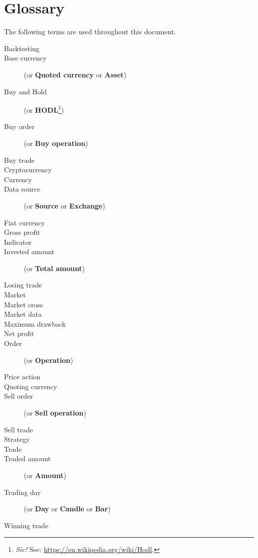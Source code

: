 \chapter{Glossary}\label{appendix:glossary}

The following terms are used throughout this document.

\begin{description}
	\item[Backtesting]
	\item[Base currency] (or \textbf{Quoted currency} or \textbf{Asset})
	\item[Buy and Hold] (or \textbf{HODL}\footnote{\textit{Sic!} See:
		\url{https://en.wikipedia.org/wiki/Hodl}.})
	\item[Buy order] (or \textbf{Buy operation})
	\item[Buy trade]
	\item[Cryptocurrency]
	\item[Currency]
	\item[Data source] (or \textbf{Source} or \textbf{Exchange})
	\item[Fiat currency]
	\item[Gross profit]
	\item[Indicator]
	\item[Invested amount] (or \textbf{Total amount})
	\item[Losing trade]
	\item[Market]
	\item[Market cross]
	\item[Market data]
	\item[Maximum drawback]
	\item[Net profit]
	\item[Order] (or \textbf{Operation})
	\item[Price action]
	\item[Quoting currency]
	\item[Sell order] (or \textbf{Sell operation})
	\item[Sell trade]
	\item[Strategy]
	\item[Trade]
	\item[Traded amount] (or \textbf{Amount})
	\item[Trading day] (or \textbf{Day} or \textbf{Candle} or \textbf{Bar})
	\item[Winning trade]
\end{description}

